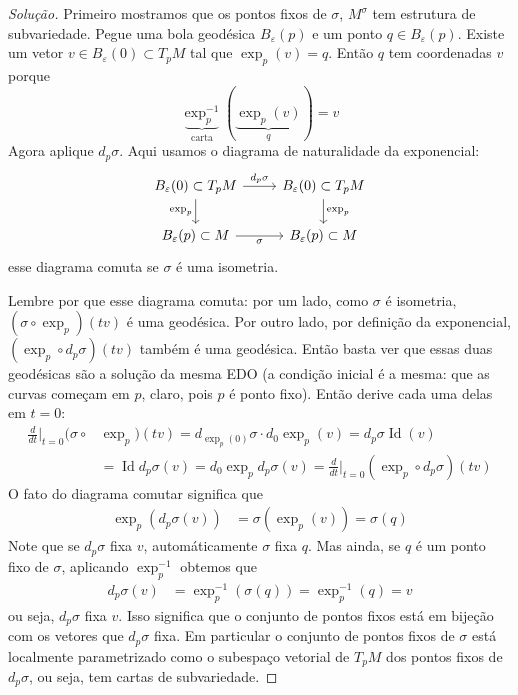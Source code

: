 \begin{proof}[Solução]\leavevmode
Primeiro mostramos que os pontos fixos de \(\sigma\), \(M^\sigma\) tem estrutura de subvariedade. Pegue uma bola geodésica \(B_\varepsilon(p)\) e um ponto \(q \in B_\varepsilon(p)\). Existe um vetor \(v \in B_\varepsilon(0) \subset T_pM\) tal que \(\operatorname{exp}_p(v)=q\). Então \(q\) tem coordenadas \(v\) porque
 \[\underbrace{\operatorname{exp}^{-1}_p}_{\text{carta} }(\underbrace{\operatorname{exp}_p(v)}_{q})=v\]
Agora aplique \(d_p\sigma\). Aqui usamos o diagrama de naturalidade da exponencial:
\[\begin{tikzcd}
	B_\varepsilon(0)\subset T_pM\arrow[r,"d_p\sigma"]\arrow[d,"\operatorname{exp}_p",swap]&B_\varepsilon(0) \subset T_pM\arrow[d,"\operatorname{exp}_p"]\\
	B_\varepsilon(p)\subset M\arrow[r,swap,"\sigma"]&B_\varepsilon(p) \subset M
\end{tikzcd}\]
esse diagrama comuta se \(\sigma\) é uma isometria. 

Lembre por que esse diagrama comuta: por um lado, como \(\sigma\) é isometria, \((\sigma \circ \operatorname{exp}_p)(tv)\) é uma geodésica. Por outro lado, por definição da exponencial, \((\operatorname{exp}_p \circ d_p\sigma)(tv)\) também é uma geodésica. Então basta ver que essas duas geodésicas são a solução da mesma EDO (a condição inicial é a mesma: que as curvas começam em \(p\), claro, pois \(p\) é ponto fixo). Então derive cada uma delas em \(t=0\):
\begin{align*}
\frac{d}{dt}\Big|_{t=0}(\sigma \circ& \operatorname{exp}_p)(tv)=d_{\operatorname{exp}_p(0)}\sigma\cdot d_{0}\operatorname{exp}_p(v)=d_p\sigma \operatorname{Id}(v)\\&=\operatorname{Id} d_p\sigma(v)=d_0 \operatorname{exp}_p d_p\sigma(v)=\frac{d}{dt}\Big|_{t=0}(\operatorname{exp}_p \circ d_p\sigma)(tv)
\end{align*}
O fato do diagrama comutar significa que
\begin{align*}
	\operatorname{exp}_p(d_p\sigma(v))&=\sigma(\operatorname{exp}_p(v))=\sigma(q)\end{align*}
Note que se \(d_p\sigma\) fixa \(v\), automáticamente \(\sigma\) fixa \(q\). Mas ainda, se \(q\) é um ponto fixo de \(\sigma\), aplicando \(\operatorname{exp}_p^{-1}\) obtemos que
\begin{align*}
d_p\sigma(v)&=\operatorname{exp}^{-1}_p(\sigma(q))=\operatorname{exp}^{-1}_p(q)=v
\end{align*}
ou seja, \(d_p\sigma\) fixa \(v\). Isso significa que o conjunto de pontos fixos está em bijeção com os vetores que \(d_p\sigma\) fixa. Em particular o conjunto de pontos fixos de \(\sigma\) está localmente parametrizado como o subespaço vetorial de \(T_pM\) dos pontos fixos de \(d_p\sigma\), ou seja, tem cartas de subvariedade.


\end{proof}
